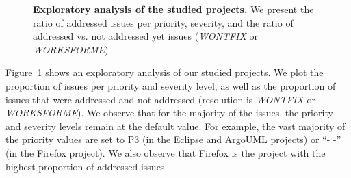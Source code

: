 \begin{figure}[t]
	\centering


	\caption{\textbf{Exploratory analysis of the studied projects.} We
		present the ratio of addressed issues per priority, severity, and the
		ratio of addressed vs. not addressed yet issues (\eg \textit{WONTFIX} or
	\textit{WORKSFORME})}
	\label{ch4:fig:preliminary_studied_system}
\end{figure}

\hyperref[ch4:fig:preliminary_studied_system]{Figure}~\ref{ch4:fig:preliminary_studied_system}
shows an exploratory analysis of our studied projects. We plot the proportion of
issues per priority and severity level, as well as the proportion of issues that
were addressed and not addressed (\eg resolution is \textit{WONTFIX} or
\textit{WORKSFORME}). We observe that for the majority of the issues, the
priority and severity levels remain at the default value. For example, the vast
majority of the priority values are set to P3 (in the Eclipse and ArgoUML
projects) or ``- -'' (in the Firefox project). We also observe that Firefox is
the project with the highest proportion of addressed issues.


